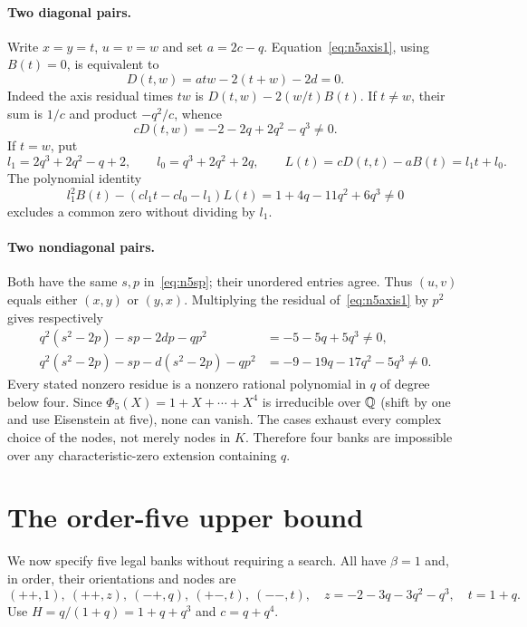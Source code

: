 \documentclass[11pt,letterpaper]{article}
\theoremstyle{definition}\newtheorem{definition}[theorem]{Definition}
\begin{document}
\paragraph{Two diagonal pairs.}
Write $x=y=t$, $u=v=w$ and set $a=2c-q$. Equation~\eqref{eq:n5axis1}, using $B(t)=0$, is equivalent to
\[
 D(t,w)=a t w-2(t+w)-2d=0.
\]
Indeed the axis residual times $tw$ is $D(t,w)-2(w/t)B(t)$. If $t\ne w$, their sum is $1/c$ and product $-q^2/c$, whence
\begin{equation}\label{eq:n5distinct}
 cD(t,w)=-2-2q+2q^2-q^3\ne0.
\end{equation}
If $t=w$, put
\[
 l_1=2q^3+2q^2-q+2,\qquad l_0=q^3+2q^2+2q,
 \qquad L(t)=cD(t,t)-aB(t)=l_1t+l_0.
\]
The polynomial identity
\begin{equation}\label{eq:n5bezout}
 l_1^2B(t)-(cl_1t-cl_0-l_1)L(t)
 =1+4q-11q^2+6q^3\ne0
\end{equation}
excludes a common zero without dividing by $l_1$.

\paragraph{Two nondiagonal pairs.}
Both have the same $s,p$ in~\eqref{eq:n5sp}; their unordered entries agree. Thus $(u,v)$ equals either $(x,y)$ or $(y,x)$. Multiplying the residual of~\eqref{eq:n5axis1} by $p^2$ gives respectively
\begin{align}
 q^2(s^2-2p)-sp-2dp-qp^2&=-5-5q+5q^3\ne0,\label{eq:n5non1}\\
 q^2(s^2-2p)-sp-d(s^2-2p)-qp^2&=-9-19q-17q^2-5q^3\ne0.\label{eq:n5non2}
\end{align}
Every stated nonzero residue is a nonzero rational polynomial in $q$ of degree below four. Since $\Phi_5(X)=1+X+\cdots+X^4$ is irreducible over $\mathbb Q$ (shift by one and use Eisenstein at five), none can vanish. The cases exhaust every complex choice of the nodes, not merely nodes in $K$. Therefore four banks are impossible over any characteristic-zero extension containing $q$.

\section{The order-five upper bound}\label{sec:n5upper}

We now specify five legal banks without requiring a search. All have $\beta=1$ and, in order, their orientations and nodes are
\begin{equation}\label{eq:n5nodes}
 (++,1),\ (++,z),\ (-+,q),\ (+-,t),\ (--,t),
 \quad z=-2-3q-3q^2-q^3,\quad t=1+q.
\end{equation}
Use $H=q/(1+q)=1+q+q^3$ and $c=q+q^4$.
\end{document}
